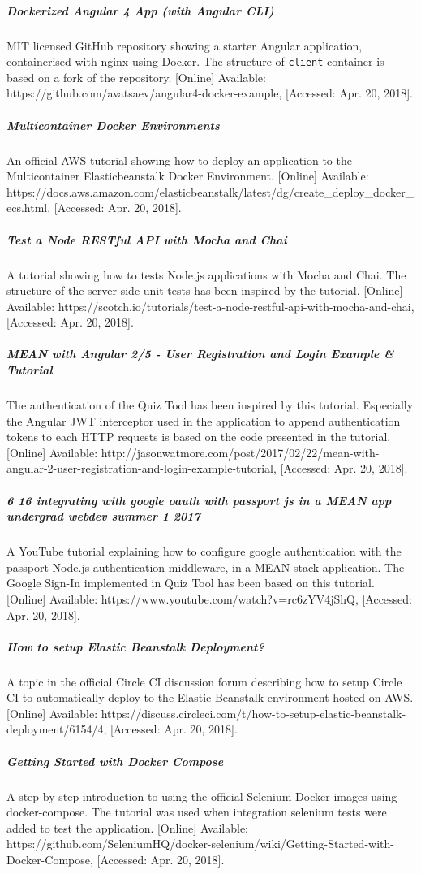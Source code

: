 \subparagraph{Dockerized Angular 4 App (with Angular CLI)}
MIT licensed GitHub repository showing a starter Angular application, containerised with nginx
using Docker. The structure of \texttt{client} container is based on a fork of the repository.
[Online] Available: https://github.com/avatsaev/angular4-docker-example, [Accessed: Apr. 20, 2018].

\subparagraph{Multicontainer Docker Environments}
An official AWS tutorial showing how to deploy an application to the Multicontainer Elasticbeanstalk Docker
Environment. [Online] Available: https://docs.aws.amazon.com/elasticbeanstalk/latest/dg/create\_deploy\_docker\_ecs.html, [Accessed: Apr. 20, 2018].

\subparagraph{Test a Node RESTful API with Mocha and Chai}
A tutorial showing how to tests Node.js applications with Mocha and Chai. The structure of the server side
unit tests has been inspired by the tutorial. [Online] Available: https://scotch.io/tutorials/test-a-node-restful-api-with-mocha-and-chai,
[Accessed: Apr. 20, 2018].

\subparagraph{MEAN with Angular 2/5 - User Registration and Login Example \& Tutorial}
The authentication of the Quiz Tool has been inspired by this tutorial. Especially the Angular
JWT interceptor used in the application to append authentication tokens to each HTTP requests is based on the
code presented in the tutorial. [Online] Available: http://jasonwatmore.com/post/2017/02/22/mean-with-angular-2-user-registration-and-login-example-tutorial,
[Accessed: Apr. 20, 2018].

\subparagraph{6 16 integrating with google oauth with passport js in a MEAN app undergrad webdev summer 1 2017}
A YouTube tutorial explaining how to configure google authentication with the passport Node.js
authentication middleware, in a MEAN stack application. The Google Sign-In implemented in Quiz Tool
has been based on this tutorial. [Online] Available: https://www.youtube.com/watch?v=rc6zYV4jShQ,
[Accessed: Apr. 20, 2018].

\subparagraph{How to setup Elastic Beanstalk Deployment?}
A topic in the official Circle CI discussion forum describing how to setup Circle CI to automatically
deploy to the Elastic Beanstalk environment hosted on AWS. [Online] Available: https://discuss.circleci.com/t/how-to-setup-elastic-beanstalk-deployment/6154/4,
[Accessed: Apr. 20, 2018].

\subparagraph{Getting Started with Docker Compose}
A step-by-step introduction to using the official Selenium Docker images using docker-compose. The tutorial
was used when integration selenium tests were added to test the application.
[Online] Available: https://github.com/SeleniumHQ/docker-selenium/wiki/Getting-Started-with-Docker-Compose,
[Accessed: Apr. 20, 2018].










%
